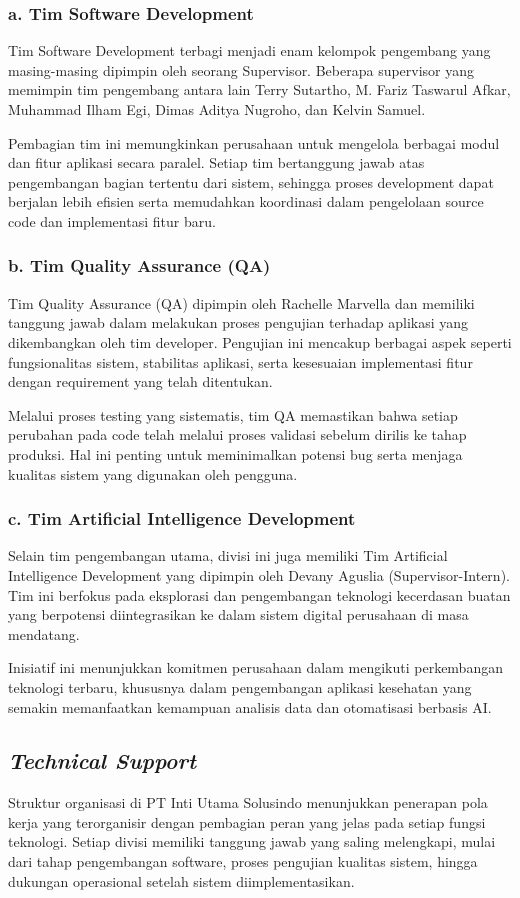{\leftskip=1.27cm
\subsubsection{\textbf{a. Tim Software Development}}
Tim Software Development terbagi menjadi enam kelompok pengembang yang
masing-masing dipimpin oleh seorang Supervisor. Beberapa supervisor yang
memimpin tim pengembang antara lain Terry Sutartho, M. Fariz Taswarul Afkar,
Muhammad Ilham Egi, Dimas Aditya Nugroho, dan Kelvin Samuel.

Pembagian tim ini memungkinkan perusahaan untuk mengelola berbagai modul dan
fitur aplikasi secara paralel. Setiap tim bertanggung jawab atas pengembangan
bagian tertentu dari sistem, sehingga proses development dapat berjalan lebih
efisien serta memudahkan koordinasi dalam pengelolaan source code dan
implementasi fitur baru.

\subsubsection{\textbf{b. Tim Quality Assurance (QA)}}

Tim Quality Assurance (QA) dipimpin oleh Rachelle Marvella dan memiliki
tanggung jawab dalam melakukan proses pengujian terhadap aplikasi yang
dikembangkan oleh tim developer. Pengujian ini mencakup berbagai aspek seperti
fungsionalitas sistem, stabilitas aplikasi, serta kesesuaian implementasi fitur
dengan requirement yang telah ditentukan.

Melalui proses testing yang sistematis, tim QA memastikan bahwa setiap
perubahan pada code telah melalui proses validasi sebelum dirilis ke tahap
produksi. Hal ini penting untuk meminimalkan potensi bug serta menjaga kualitas
sistem yang digunakan oleh pengguna.

\subsubsection{\textbf{c. Tim Artificial Intelligence Development}}

Selain tim pengembangan utama, divisi ini juga memiliki Tim Artificial
Intelligence Development yang dipimpin oleh Devany Aguslia (Supervisor-Intern).
Tim ini berfokus pada eksplorasi dan pengembangan teknologi kecerdasan buatan
yang berpotensi diintegrasikan ke dalam sistem digital perusahaan di masa
mendatang.

Inisiatif ini menunjukkan komitmen perusahaan dalam mengikuti perkembangan
teknologi terbaru, khususnya dalam pengembangan aplikasi kesehatan yang semakin
memanfaatkan kemampuan analisis data dan otomatisasi berbasis AI.

}

\subsection{\textit{Technical Support}}

Struktur organisasi di PT Inti Utama Solusindo menunjukkan penerapan pola kerja
yang terorganisir dengan pembagian peran yang jelas pada setiap fungsi
teknologi. Setiap divisi memiliki tanggung jawab yang saling melengkapi, mulai
dari tahap pengembangan software, proses pengujian kualitas sistem, hingga
dukungan operasional setelah sistem diimplementasikan.
